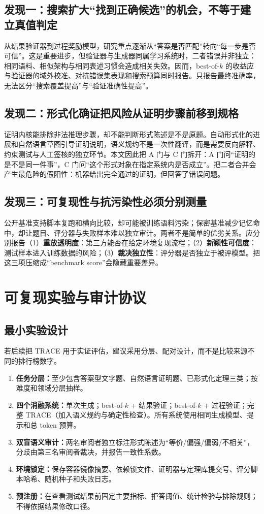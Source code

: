 \documentclass[UTF8,11pt,a4paper,fontset=fandol]{ctexart}
\newcommand{\trace}{\textsf{TRACE}}
\begin{document}
\subsection{发现一：搜索扩大“找到正确候选”的机会，不等于建立真值判定}
从结果验证器到过程奖励模型，研究重点逐渐从“答案是否匹配”转向“每一步是否可信”\cite{cobbe2021verifiers,lightman2024verify}。这是重要进步，但验证器与生成器同属学习系统时，二者错误并非独立：相同语料、相似架构与相同表述习惯会造成相关失效。因而，best-of-$k$ 的收益应与验证器的域外校准、对抗错误集表现和搜索预算同时报告。只报告最终准确率，无法区分“搜索覆盖提高”与“验证准确性提高”。

\subsection{发现二：形式化确证把风险从证明步骤前移到规格}
证明内核能排除非法推理步骤，却不能判断形式陈述是不是原题。自动形式化的进展\cite{wu2022autoformalization}和自然语言草图引导证明\cite{jiang2023draft}说明，语义规约不是一次性翻译，而是需要反向解释、约束测试与人工签核的独立环节。本文因此把 A 门与 C 门拆开：A 门问“证明的是不是同一件事”，C 门问“这个形式对象在指定系统内是否成立”。把二者合并会产生最危险的假阳性：机器给出完全通过的证明，但回答了错误问题。

\subsection{发现三：可复现性与抗污染性必须分别测量}
公开基准支持脚本复跑和横向比较，却可能被训练语料污染；保密基准减少记忆命中，却让题目、评分器与失败样本难以独立审计。两者不是简单的优劣关系。应分别报告（1）\textbf{重放透明度}：第三方能否在给定环境复现流程；（2）\textbf{新颖性可信度}：测试样本进入训练数据的风险；（3）\textbf{裁决独立性}：评分器是否独立于被评模型。把这三项压缩成“benchmark score”会隐藏重要差异。

\section{可复现实验与审计协议}
\subsection{最小实验设计}
若后续把 \trace{} 用于实证评估，建议采用分层、配对设计，而不是比较来源不同的排行榜数字。
\begin{enumerate}[label=\arabic*.]
  \item \textbf{任务分层：}至少包含答案型文字题、自然语言证明题、已形式化定理三类；按难度和领域分层抽样。
  \item \textbf{四个消融系统：}单次生成；best-of-$k$ + 结果验证；best-of-$k$ + 过程验证；完整 \trace{}（加入语义规约与确定性检查）。所有系统使用相同生成模型、提示和总 token 预算。
  \item \textbf{双盲语义审计：}两名审阅者独立标注形式陈述为“等价/偏强/偏弱/不相关”，分歧由第三名审阅者裁决，并报告一致性系数。
  \item \textbf{环境锁定：}保存容器镜像摘要、依赖锁文件、证明器与定理库提交号、评分脚本哈希、随机种子和失败日志。
  \item \textbf{预注册：}在查看测试结果前固定主要指标、拒答阈值、统计检验与排除规则；不得依据结果修改口径。
\end{enumerate}
\end{document}

